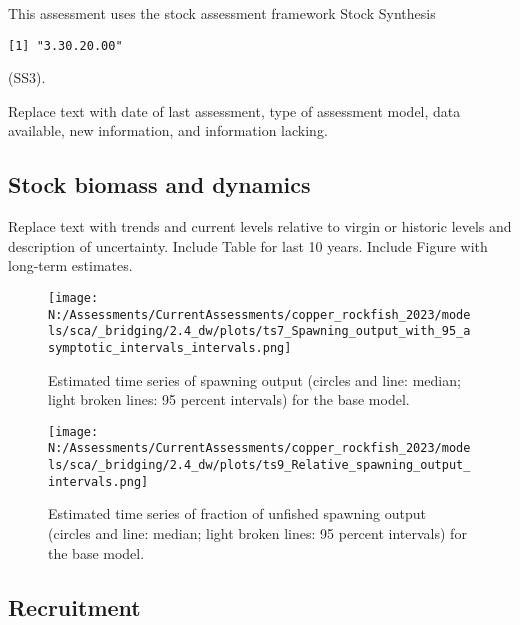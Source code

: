 \documentclass[11pt,
  english,
  letterpaper,
]{article}
\begin{document}
This assessment uses the stock assessment framework Stock Synthesis

\begin{verbatim}
[1] "3.30.20.00"
\end{verbatim}

(SS3).

Replace text with date of last assessment, type of assessment model, data available, new information, and information lacking.

\hypertarget{stock-biomass-and-dynamics}{%
\subsection*{Stock biomass and dynamics}\label{stock-biomass-and-dynamics}}

Replace text with trends and current levels relative to virgin or historic levels and description of uncertainty. Include Table for last 10 years. Include Figure with long-term estimates.



\begin{figure}
\centering
\texttt{[image: N:/Assessments/CurrentAssessments/copper\_rockfish\_2023/models/sca/\_bridging/2.4\_dw/plots/ts7\_Spawning\_output\_with\_95\_asymptotic\_intervals\_intervals.png]}
\caption{Estimated time series of spawning output (circles and line: median; light broken lines: 95 percent intervals) for the base model.\label{fig:es-sb}}
\end{figure}

\begin{figure}
\centering
\texttt{[image: N:/Assessments/CurrentAssessments/copper\_rockfish\_2023/models/sca/\_bridging/2.4\_dw/plots/ts9\_Relative\_spawning\_output\_intervals.png]}
\caption{Estimated time series of fraction of unfished spawning output (circles and line: median; light broken lines: 95 percent intervals) for the base model.\label{fig:es-depl}}
\end{figure}

\clearpage

\hypertarget{recruitment}{%
\subsection*{Recruitment}\label{recruitment}}
\end{document}
